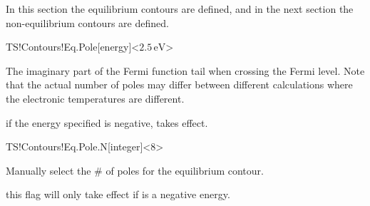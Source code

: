 In this section the equilibrium contours are defined, and in the next
section the non-equilibrium contours are defined.

\begin{fdfentry}{TS!Contours!Eq.Pole}[energy]<$2.5\,\mathrm{eV}$>

  The imaginary part of the Fermi function tail when crossing the
  Fermi level. Note that the actual number of poles may differ between
  different calculations where the electronic temperatures are
  different.

  \note if the energy specified is negative,
   takes effect.
  
\end{fdfentry}

\begin{fdfentry}{TS!Contours!Eq.Pole.N}[integer]<8>

  Manually select the \# of poles for the equilibrium contour. 

  \note this flag will only take effect if 
  is a negative energy.
  
\end{fdfentry}

